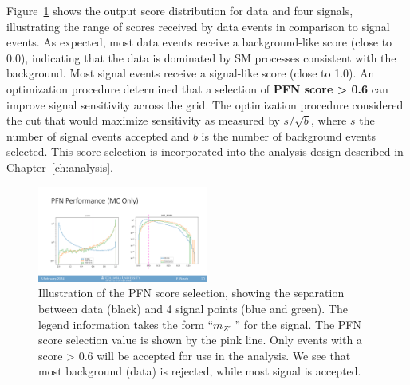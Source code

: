 Figure~\ref{fig:pfn_score_all} shows the output score distribution for data and four signals, illustrating the range of scores received by data events in comparison to signal events.
As expected, most data events receive a background-like score (close to 0.0), indicating that the data is dominated by SM processes consistent with the background.
Most signal events receive a signal-like score (close to 1.0).
An optimization procedure determined that a selection of \textbf{PFN score > 0.6} can improve signal sensitivity across the grid.
The optimization procedure considered the cut that would maximize sensitivity as measured by $s/\sqrt{b}$, where $s$ the number of signal events accepted and $b$ is the number of background events selected.
This score selection is incorporated into the analysis design described in Chapter~\ref{ch:analysis}. 

\begin{figure}[!htbp]
\centering
   \includegraphics[width=0.5\textwidth]{figures/ml/pfn_score_all}
   \caption{Illustration of the PFN score selection, showing the separation between data (black) and 4 signal points (blue and green). The legend information takes the form ``$m_{Z'}$ \rinv'' for the signal. The PFN score selection value is shown by the pink line. Only events with a score > 0.6 will be accepted for use in the analysis. We see that most background (data) is rejected, while most signal is accepted.}
   \label{fig:pfn_score_all}
\end{figure}


\clearpage

